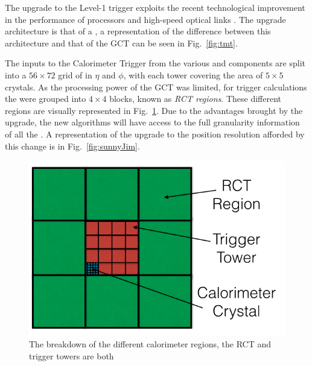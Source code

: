 The upgrade to the Level-1 trigger exploits the recent technological
improvement in the performance of \FPGA processors and high-speed
optical links \cite{tp}. The upgrade architecture is that of a \TMT, a 
representation of the difference between this architecture and that of
the \ac{GCT} can be seen in Fig.~\ref{fig:tmt}.

The inputs to the Calorimeter Trigger from the various \ECAL and \HCAL
components are split into a $56\times 72$ grid of \TTs in $\eta$ and
$\phi$, with each tower covering the area of $5\times5$ \ECAL crystals.
As the processing power of the \ac{GCT} was limited, for trigger
calculations the \TTs were grouped into $4\times4$ blocks, known as
\emph{RCT regions}. These different regions are visually represented
in Fig.~\ref{fig:trigger_calorimeter}. Due to the advantages brought
by the upgrade, the new algorithms will have access to the full
granularity information of all the \TTs. A representation of the
upgrade to the position resolution afforded by this change is in
Fig.~\ref{fig:sunnyJim}.

\begin{figure}
	\begin{center}
		\includegraphics[width=0.7\linewidth]{figs/trigger/trigger_calorimeter}
	\end{center}
	\caption{The breakdown of the different calorimeter regions, the RCT
  and trigger towers are both }
	\label{fig:trigger_calorimeter}
\end{figure}

